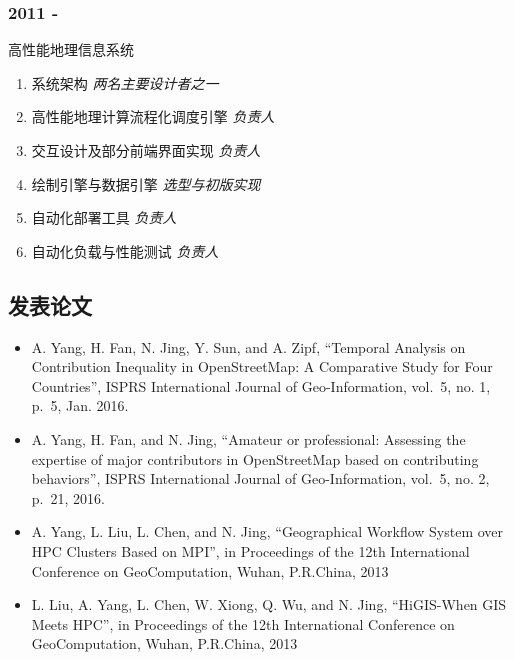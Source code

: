 \documentclass[12pt,]{article}
\providecommand{\tightlist}{%
  \setlength{\itemsep}{0pt}\setlength{\parskip}{0pt}}
\begin{document}
\subsubsection{2011 -}\label{section-4}

高性能地理信息系统

\begin{enumerate}
\tightlist
\item
  系统架构 \emph{两名主要设计者之一}
\item
  高性能地理计算流程化调度引擎 \emph{负责人}
\item
  交互设计及部分前端界面实现 \emph{负责人}
\item
  绘制引擎与数据引擎 \emph{选型与初版实现}
\item
  自动化部署工具 \emph{负责人}
\item
  自动化负载与性能测试 \emph{负责人}
\end{enumerate}

\subsection{发表论文}\label{ux53d1ux8868ux8bbaux6587}

\begin{itemize}
\tightlist
\item
  A. Yang, H. Fan, N. Jing, Y. Sun, and A. Zipf, ``Temporal Analysis on
  Contribution Inequality in OpenStreetMap: A Comparative Study for Four
  Countries'', ISPRS International Journal of Geo-Information, vol.~5,
  no. 1, p.~5, Jan. 2016.
\item
  A. Yang, H. Fan, and N. Jing, ``Amateur or professional: Assessing the
  expertise of major contributors in OpenStreetMap based on contributing
  behaviors'', ISPRS International Journal of Geo-Information, vol.~5,
  no. 2, p.~21, 2016.
\item
  A. Yang, L. Liu, L. Chen, and N. Jing, ``Geographical Workflow System
  over HPC Clusters Based on MPI'', in Proceedings of the 12th
  International Conference on GeoComputation, Wuhan, P.R.China, 2013
\item
  L. Liu, A. Yang, L. Chen, W. Xiong, Q. Wu, and N. Jing, ``HiGIS-When
  GIS Meets HPC'', in Proceedings of the 12th International Conference
  on GeoComputation, Wuhan, P.R.China, 2013
\end{itemize}
\end{document}
